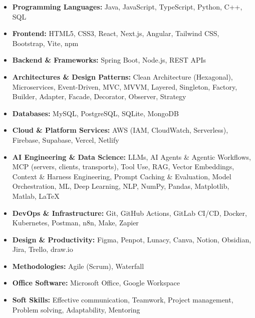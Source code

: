 \begin{itemize}[leftmargin=0.15in, label={}]
    \item \textbf{Programming Languages:} Java, JavaScript, TypeScript, Python, C++, SQL
    \item \textbf{Frontend:} HTML5, CSS3, React, Next.js, Angular, Tailwind CSS, Bootstrap, Vite, npm
    \item \textbf{Backend \& Frameworks:} Spring Boot, Node.js, REST APIs
    \item \textbf{Architectures \& Design Patterns:} Clean Architecture (Hexagonal), Microservices, Event-Driven, MVC, MVVM, Layered, Singleton, Factory, Builder, Adapter, Facade, Decorator, Observer, Strategy
    \item \textbf{Databases:} MySQL, PostgreSQL, SQLite, MongoDB
    \item \textbf{Cloud \& Platform Services:} AWS (IAM, CloudWatch, Serverless), Firebase, Supabase, Vercel, Netlify
    \item \textbf{AI Engineering \& Data Science:} LLMs, AI Agents \& Agentic Workflows, MCP (servers, clients, transports), Tool Use, RAG, Vector Embeddings, Context \& Harness Engineering, Prompt Caching \& Evaluation, Model Orchestration, ML, Deep Learning, NLP, NumPy, Pandas, Matplotlib, Matlab, \LaTeX
    \item \textbf{DevOps \& Infrastructure:} Git, GitHub Actions, GitLab CI/CD, Docker, Kubernetes, Postman, n8n, Make, Zapier
    \item \textbf{Design \& Productivity:} Figma, Penpot, Lunacy, Canva, Notion, Obsidian, Jira, Trello, draw.io
    \item \textbf{Methodologies:} Agile (Scrum), Waterfall
    \item \textbf{Office Software:} Microsoft Office, Google Workspace
    \item \textbf{Soft Skills:} Effective communication, Teamwork, Project management, Problem solving, Adaptability, Mentoring
\end{itemize}
